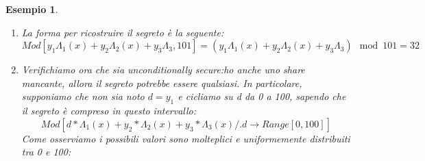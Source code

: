 \documentclass{book}
\newtheorem*{Importante}{\textbf{\textcolor{red}{Importante}}}
\newtheorem{esempio}{\textcolor{Grey1}{Esempio}}
\begin{document}
\begin{esempio}
\begin{enumerate}
		      \begin{equation*}
			      \begin{matrix}
				      \Lambda_{1}(x)= Mod[(0-x{2})*(0-x_{4})*PowerMod[(x_{1}-x{2})*(x_{1}-x{4}),-1,101],101]=63 \\
				      \Lambda_{2}(x)= Mod[(0-x{1})*(0-x_{4})*PowerMod[(x_{2}-x{1})*(x_{2}-x{4}),-1,101],101]=49 \\
				      \Lambda_{4}(x)= Mod[(0-x{1})*(0-x_{2})*PowerMod[(x_{4}-x{1})*(x_{4}-x{2}),-1,101],101]=91
			      \end{matrix}
		      \end{equation*}
		      \begin{Importante}
			      \begin{equation*}
				      \centering
				      \Lambda_{i}(x)=\prod_{m=1,m\neq1}^{l}{\frac{x-x_{m}}{x_{i}-x_{m}}}\quad \Lambda_{i}(x_{i})=1;\quad \Lambda_{i}(x_{m})=0\quad for\ m\neq i
			      \end{equation*}
			      Questa formula imporrebbe di scrivere il denominatore sotto il segno di frazione, ma questo non è possibile se si effettua il modulo\@. Quindi, quello che occorre fare è effettuare l'inversa del modulo: in mathematica si utilizza PowerMod. Per esempio per \(\Lambda_{1}(0)\):
			      \begin{equation*}
				      \Lambda_{1}(x)= Mod[(0-x{2})*(0-x_{4})*PowerMod[(x_{1}-x{2})*(x_{1}-x{4}),-1,101],101]=(\frac{(0-x{2})*(0-x_{4})}{(x_{1}-x{2})*(x_{1}-x{4})})\mod{p}
			      \end{equation*}
			      In cui:
			      \begin{equation*}
				      \frac{1}{(x_{1}-x_{2})*(x_{1}-x_{4})}\mod{101}=
				      {((x_{1}-x_{2})(x_{1}-x{4}))}^{-1}\mod{101}
			      \end{equation*}
		      \end{Importante}
		\item La forma per ricostruire il segreto è la seguente:
		      \begin{equation*}
			      Mod[y_{1}\Lambda_{1}(x)+y_{2}\Lambda_{2}(x)+y_{3}\Lambda_{3},101]=(y_{1}\Lambda_{1}(x)+y_{2}\Lambda_{2}(x)+y_{3}\Lambda_{3})\mod{101}=32
		      \end{equation*}
		\item Verifichiamo ora che sia unconditionally secure: ho anche uno share mancante, allora il segreto potrebbe essere qualsiasi\@. In particolare, supponiamo che non sia noto \(d=y_{1}\) e cicliamo su d da 0 a 100, sapendo che il segreto è compreso in questo intervallo:
		      \begin{equation*}
			      Mod[d*\Lambda_{1}(x)+y_{2}*\Lambda_{2}(x)+y_{3}*\Lambda_{3}(x)/.{d\rightarrow Range[0,100]}]
		      \end{equation*}
		      Come osserviamo i possibili valori sono molteplici e uniformemente distribuiti tra 0 e 100:
	\end{enumerate}
\end{esempio}
\end{document}
